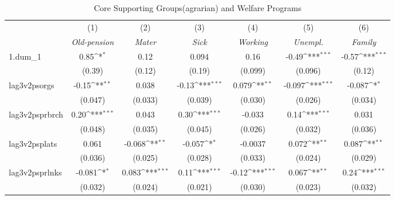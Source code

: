 \begin{table}[htbp]\centering
\def\sym#1{\ifmmode^{#1}\else\(^{#1}\)\fi}
\caption{Core Supporting Groups(agrarian) and Welfare Programs}
\begin{tabular}{l*{6}{c}}
\hline\hline
            &\multicolumn{1}{c}{(1)}         &\multicolumn{1}{c}{(2)}         &\multicolumn{1}{c}{(3)}         &\multicolumn{1}{c}{(4)}         &\multicolumn{1}{c}{(5)}         &\multicolumn{1}{c}{(6)}         \\
		&      \textit{Old-pension}         &      \textit{Mater}         &     \textit{Sick}         &     \textit{Working}         &    \textit{Unempl.}        &     \textit{Family}         \\
\hline
1.dum\_1     &        0.85\sym{*}  &        0.12         &       0.094         &        0.16         &       -0.49\sym{***}&       -0.57\sym{***}\\
            &      (0.39)         &      (0.12)         &      (0.19)         &     (0.099)         &     (0.096)         &      (0.12)         \\
[1em]
lag3v2psorgs&       -0.15\sym{**} &       0.038         &       -0.13\sym{***}&       0.079\sym{**} &      -0.097\sym{***}&      -0.087\sym{*}  \\
            &     (0.047)         &     (0.033)         &     (0.039)         &     (0.030)         &     (0.026)         &     (0.034)         \\
[1em]
lag3v2psprbrch&        0.20\sym{***}&       0.043         &        0.30\sym{***}&      -0.033         &        0.14\sym{***}&       0.031         \\
            &     (0.048)         &     (0.035)         &     (0.045)         &     (0.026)         &     (0.032)         &     (0.036)         \\
[1em]
lag3v2psplats&       0.061         &      -0.068\sym{**} &      -0.057\sym{*}  &     -0.0037         &       0.072\sym{**} &       0.087\sym{**} \\
            &     (0.036)         &     (0.025)         &     (0.028)         &     (0.033)         &     (0.024)         &     (0.029)         \\
[1em]
lag3v2psprlnks&      -0.081\sym{*}  &       0.083\sym{***}&        0.11\sym{***}&       -0.12\sym{***}&       0.067\sym{**} &        0.24\sym{***}\\
            &     (0.032)         &     (0.024)         &     (0.021)         &     (0.030)         &     (0.023)         &     (0.032)         \\

\end{tabular}
\end{table}
